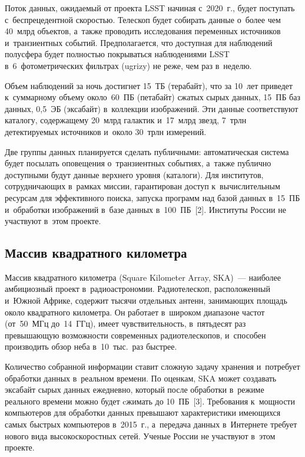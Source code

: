\begin{multicols}{2}
  Поток данных, ожидаемый от проекта LSST начиная с~2020~г., будет поступать 
с~беспрецедентной скоростью. Телескоп будет собирать данные о~более чем 
40~млрд объектов, а~так\-же проводить исследования переменных источников 
и~транзиентных событий. Предполагается, что доступная для наблю\-де\-ний полусфера будет 
полностью покрываться наблюдениями LSST в~6~фотометрических фильтрах (ugrizy) не 
реже, чем раз в~неделю.
  
  Объем наблюдений за ночь достигнет 15~ТБ (терабайт), что за 10~лет приведет к~суммарному 
объему около~60~ПБ  (петабайт) сжатых сырых данных, 15~ПБ  баз данных, 0,5~ЭБ
(эксабайт)  в~коллекции 
изображений. Эти данные соответствуют каталогу, содержащему 20~млрд галактик 
и~17~млрд звезд, 7~трлн детектируемых источников и~около 30~трлн 
измерений.
  
  Две группы данных планируется сделать пуб\-лич\-ны\-ми: автоматическая система будет 
посылать оповещения о~транзиентных событиях, а~также пуб\-лич\-но доступными будут 
данные верхнего уровня (катало\-ги). Для институтов, сотрудничающих в~рамках миссии, 
гарантирован доступ к~вычислительным ресурсам для эффективного поиска, запуска 
программ над базой данных в~15~ПБ и~обработки изображений в~базе данных 
в~100~ПБ~[2]. Институты России не участвуют в~этом проекте. 

\subsection{Массив квадратного километра} 

Массив квадратного километра (Square Kilometer Array, SKA)~--- наиболее амбициозный проект в~радиоастрономии. Радиотелескоп, 
расположенный и~Южной Африке, содержит тысячи отдельных антенн, занимающих 
площадь около квадратного километра. Он работает в~широком диапазоне час\-тот 
(от~50~МГц до~14~ГГц), имеет чувствительность, в~пятьдесят раз превышающую 
возможности современных радиотелескопов, и~способен производить обзор неба в~10~тыс.\
 раз быстрее. 
  
  Количество собранной информации ставит сложную задачу хранения и~потребует 
обработки данных в~реальном времени. По оценкам, SKA может создавать эксабайт  
сырых данных ежедневно, который после обработки в~режиме реального времени можно 
будет cжимать до 10~ПБ~[3]. Требования к~мощности компьютеров для обработки данных 
превышают характеристики имеющихся самых быстрых компьютеров в~2015~г., 
а~передача данных в~Интернете требует нового вида высокоскоростных сетей. Ученые 
России не участвуют в~этом проекте.


\end{multicols}
